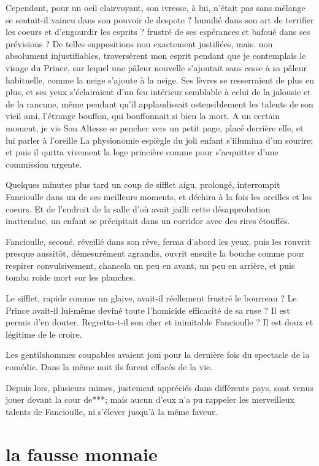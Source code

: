 Cependant, pour un oeil clairvoyant, son ivresse, à lui,
n’était pas sans mélange se sentait{}-il vaincu dans
son pouvoir de despote ? humilié dans son art de terrifier les coeurs
et d’engourdir les esprits ? frustré de ses espérances
et bafoué dans ses prévisions ? De telles suppositions non exactement
justifiées, mais. non absolument injustifiables, traversèrent mon
esprit pendant que je contemplais le visage du Prince, sur lequel une
pâleur nouvelle s’ajoutait sans cesse à sa pâleur
habituelle, comme la neige s’ajoute à la neige. Ses
lèvres se resserraient de plus en plus, et ses yeux
s’éclairaient d’un feu intérieur
semblable à celui de la jalousie et de la rancune, même pendant
qu’il applaudissait ostensiblement les talents de son
vieil ami, l’étrange bouffon, qui bouffonnait si bien
la mort. A un certain moment, je vis Son Altesse se pencher vers un
petit page, placé derrière elle, et lui parler à
l’oreille La physionomie espiègle du joli enfant
s’illumina d’un sourire; et puis il
quitta vivement la loge princière comme pour
s’acquitter d’une commission urgente.

Quelques minutes plus tard un coup de sifflet aigu, prolongé,
interrompit Fancioulle dans un de ses meilleurs moments, et déchira à
la fois les oreilles et les coeurs. Et de l’endroit de
la salle d’où avait jailli cette désapprobation
inattendue, un enfant se précipitait dans un corridor avec des rires
étouffés.

Fancioulle, secoué, réveillé dans son rêve, ferma
d’abord les yeux, puis les rouvrit presque aussitôt,
démesurément agrandis, ouvrit ensuite la bouche comme pour respirer
convulsivement, chancela un peu en avant, un peu en arrière, et puis
tomba roide mort sur les planches.

Le sifflet, rapide comme un glaive, avait{}-il réellement frustré le
bourreau ? Le Prince avait{}-il lui{}-même deviné toute
l’homicide efficacité de sa ruse ? Il est permis
d’en douter. Regretta{}-t{}-il son cher et inimitable
Fancioulle ? Il est doux et légitime de le croire.

Les gentilshommes coupables avaient joui pour la dernière fois du
spectacle de la comédie. Dans la même nuit ils furent effacés de la
vie.

Depuis lors, plusieurs mimes, justement appréciés dans différents pays,
sont venus jouer devant la cour de***; mais aucun
d’eux n’a pu rappeler les merveilleux
talents de Fancioulle, ni s’élever
jusqu’à la même faveur.
 
\quebra\section[La fausse monnaie]{la fausse monnaie}

